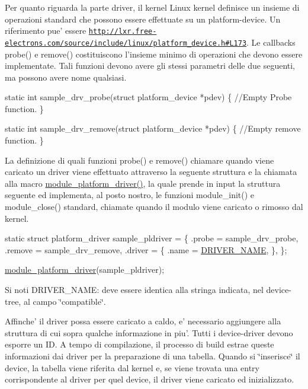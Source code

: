 Per quanto riguarda la parte driver, il kernel Linux kernel definisce un insieme di operazioni standard che possono essere effettuate su un platform-\/device. Un riferimento pue' essere \href{http://lxr.free-electrons.com/source/include/linux/platform_device.h#L173}{\tt http\+://lxr.\+free-\/electrons.\+com/source/include/linux/platform\+\_\+device.\+h\#\+L173}. Le callbacks probe() e remove() costituiscono l'insieme minimo di operazioni che devono essere implementate. Tali funzioni devono avere gli stessi parametri delle due seguenti, ma possono avere nome qualsiasi.


\begin{DoxyCode}
\textcolor{keyword}{static} \textcolor{keywordtype}{int} sample\_drv\_probe(\textcolor{keyword}{struct} platform\_device *pdev) \{
        \textcolor{comment}{//Empty Probe function.}
\}

\textcolor{keyword}{static} \textcolor{keywordtype}{int} sample\_drv\_remove(\textcolor{keyword}{struct} platform\_device *pdev) \{
        \textcolor{comment}{//Empty remove function.}
\}
\end{DoxyCode}


La definizione di quali funzioni probe() e remove() chiamare quando viene caricato un driver viene effettuato attraverso la seguente struttura e la chiamata alla macro \hyperlink{group___linux-_driver_ga61e890be90fe5582db8048893ca0ebbf}{module\+\_\+platform\+\_\+driver()}, la quale prende in input la struttura seguente ed implementa, al posto nostro, le funzioni module\+\_\+init() e module\+\_\+close() standard, chiamate quando il modulo viene caricato o rimosso dal kernel.


\begin{DoxyCode}
\textcolor{keyword}{static} \textcolor{keyword}{struct }platform\_driver sample\_pldriver = \{
    .probe  = sample\_drv\_probe,
    .remove = sample\_drv\_remove,
    .driver = \{
        .name  = \hyperlink{group___linux-_driver_ga25634d21648ca7fb7a2aca614bafaaeb}{DRIVER\_NAME},
    \},
\};

\hyperlink{group___linux-_driver_ga61e890be90fe5582db8048893ca0ebbf}{module\_platform\_driver}(sample\_pldriver);
\end{DoxyCode}


Si noti D\+R\+I\+V\+E\+R\+\_\+\+N\+A\+M\+E\+: deve essere identica alla stringa indicata, nel device-\/tree, al campo \char`\"{}compatible\char`\"{}.

Affinche' il driver possa essere caricato a caldo, e' necessario aggiungere alla struttura di cui sopra qualche informazione in piu'. Tutti i device-\/driver devono esporre un I\+D. A tempo di compilazione, il processo di build estrae queste informazioni dai driver per la preparazione di una tabella. Quando si \char`\"{}inserisce\char`\"{} il device, la tabella viene riferita dal kernel e, se viene trovata una entry corrispondente al driver per quel device, il driver viene caricato ed inizializzato.

